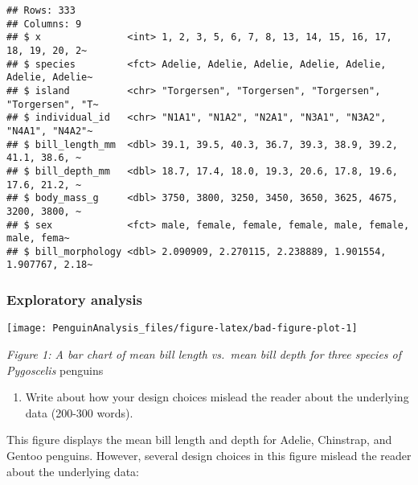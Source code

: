 \documentclass[
]{article}
\providecommand{\tightlist}{%
  \setlength{\itemsep}{0pt}\setlength{\parskip}{0pt}}
\begin{document}
\begin{verbatim}
## Rows: 333
## Columns: 9
## $ x               <int> 1, 2, 3, 5, 6, 7, 8, 13, 14, 15, 16, 17, 18, 19, 20, 2~
## $ species         <fct> Adelie, Adelie, Adelie, Adelie, Adelie, Adelie, Adelie~
## $ island          <chr> "Torgersen", "Torgersen", "Torgersen", "Torgersen", "T~
## $ individual_id   <chr> "N1A1", "N1A2", "N2A1", "N3A1", "N3A2", "N4A1", "N4A2"~
## $ bill_length_mm  <dbl> 39.1, 39.5, 40.3, 36.7, 39.3, 38.9, 39.2, 41.1, 38.6, ~
## $ bill_depth_mm   <dbl> 18.7, 17.4, 18.0, 19.3, 20.6, 17.8, 19.6, 17.6, 21.2, ~
## $ body_mass_g     <dbl> 3750, 3800, 3250, 3450, 3650, 3625, 4675, 3200, 3800, ~
## $ sex             <fct> male, female, female, female, male, female, male, fema~
## $ bill_morphology <dbl> 2.090909, 2.270115, 2.238889, 1.901554, 1.907767, 2.18~
\end{verbatim}

\subsubsection{Exploratory analysis}\label{exploratory-analysis}

\begin{center}\texttt{[image: PenguinAnalysis\_files/figure-latex/bad-figure-plot-1]} \end{center}

\emph{Figure 1: A bar chart of mean bill length vs.~mean bill depth for
three species of Pygoscelis} penguins

\begin{enumerate}
\def\labelenumi{\alph{enumi})}
\setcounter{enumi}{1}
\tightlist
\item
  Write about how your design choices mislead the reader about the
  underlying data (200-300 words).
\end{enumerate}

This figure displays the mean bill length and depth for Adelie,
Chinstrap, and Gentoo penguins. However, several design choices in this
figure mislead the reader about the underlying data:
\end{document}
